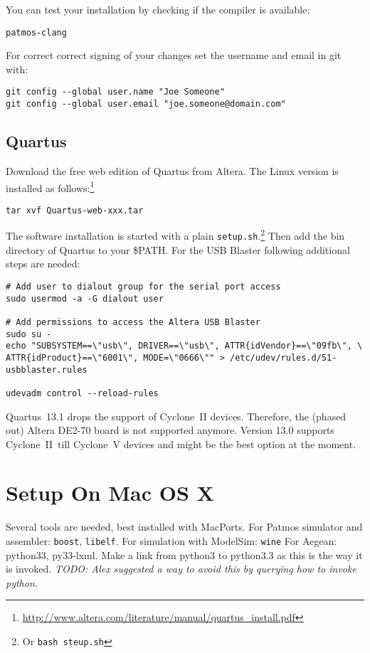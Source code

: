 \documentclass[a4paper,fontsize=10pt,twoside,DIV15,BCOR12mm,headinclude=true,footinclude=false,pagesize,bibtotoc]{scrbook}
\newcommand{\code}[1]{{\texttt{#1}}}
\newcommand{\todo}[1]{{\emph{TODO: #1}}}
\begin{document}
You can test your installation by checking if the compiler is available:

\begin{verbatim}
patmos-clang
\end{verbatim}

For correct correct signing of your changes set the username and
email in git with:

\begin{verbatim}
git config --global user.name "Joe Someone"
git config --global user.email "joe.someone@domain.com"
\end{verbatim}

\subsection{Quartus}

Download the free web edition of Quartus from Altera. The Linux version is
installed as follows:\footnote{\url{http://www.altera.com/literature/manual/quartus_install.pdf}}

\begin{verbatim}
tar xvf Quartus-web-xxx.tar
\end{verbatim}

The software installation is started with a plain \code{setup.sh}.\footnote{Or \code{bash steup.sh}}
Then add the bin directory of Quartus to your \$PATH.
%
For  the USB Blaster following additional steps are needed:

\begin{verbatim}
# Add user to dialout group for the serial port access
sudo usermod -a -G dialout user

# Add permissions to access the Altera USB Blaster
sudo su -
echo "SUBSYSTEM==\"usb\", DRIVER==\"usb\", ATTR{idVendor}==\"09fb\", \
ATTR{idProduct}==\"6001\", MODE=\"0666\"" > /etc/udev/rules.d/51-usbblaster.rules

udevadm control --reload-rules
\end{verbatim}

Quartus~13.1 drops the support of Cyclone~II devices. Therefore, the
(phased out) Altera DE2-70 board is not supported anymore. Version 13.0 supports Cyclone~II\
till Cyclone~V devices and might be the best option at the moment.

\section{Setup On Mac OS X}

Several tools are needed, best installed with MacPorts. For Patmos simulator and assembler:
\code{boost}, \code{libelf}.
For simulation with ModelSim: \code{wine}
For Aegean: python33, py33-lxml. Make a link from python3 to python3.3 as this is the way it is invoked.
\todo{Alex suggested a way to avoid this by querying how to invoke python.}
\end{document}
